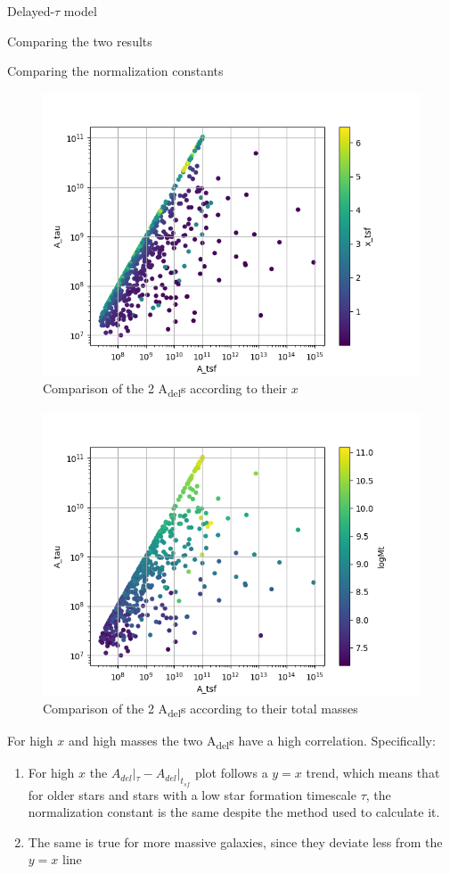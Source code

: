 \documentclass[presentation]{beamer}
\begin{document}
\begin{frame}[label={sec:org05089e9}]{Delayed-\(\tau\) model}
\begin{block}{Comparing the two results}
\begin{block}{Comparing the normalization constants}
\begin{figure}[!htpb]
\centering
\includegraphics[width=.9\linewidth]{./figs/A_tau-A_tsf_colo_X.png}
\caption{\label{fig:Comparison of the 2 A_{del}s according to their $x$}Comparison of the 2 A\textsubscript{del}s according to their \(x\)}
\end{figure}

\begin{figure}[!htpb]
\centering
\includegraphics[width=.9\linewidth]{./figs/A_tau-A_tsf_Mt.png}
\caption{\label{fig:Comparison of the 2 A_{del}s according to their total masses}Comparison of the 2 A\textsubscript{del}s according to their total masses}
\end{figure}

For high \(x\) and high masses the two A\textsubscript{del}s have a high correlation. Specifically:
\begin{enumerate}
\item For high \(x\) the \(A_{del}|_{\tau}-A_{del}|_{t_{sf}}\) plot follows a \(y=x\) trend, which means that for older stars and stars with a low star formation timescale \(\tau\), the normalization constant is the same despite the method used to calculate it.
\item The same is true for more massive galaxies, since they deviate less from the \(y=x\) line
\end{enumerate}
\end{block}


\end{block}
\end{frame}
\end{document}
